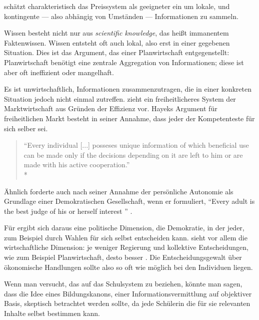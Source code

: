 \citeauthor{hayek-1945} schätzt charakteristisch das Preissystem als geeigneter ein um lokale, und kontingente --- also abhängig von Umständen --- Informationen zu sammeln.

Wissen besteht nicht nur aus \emph{scientific knowledge}, das heißt immanentem Faktenwissen.
Wissen entsteht oft auch lokal, also erst in einer gegebenen Situation.
Dies ist das Argument, das \citeauthor{hayek-1945} einer Planwirtschaft entgegenstellt:
Planwirtschaft benötigt eine zentrale Aggregation von Informationen; diese ist aber oft ineffizient oder mangelhaft.

Es ist unwirtschaftlich, Informationen zusammenzutragen, die in einer konkreten Situation jedoch nicht einmal zutreffen.
\citeauthor{hayek-1945} zieht ein freiheitlicheres System der Marktwirtschaft aus Gründen der Effizienz vor.
Hayeks Argument für freiheitlichen Markt besteht in seiner Annahme, dass jeder der Kompetenteste für sich selber sei.

\begin{quote}
	``Every individual [...] posseses unique information of which beneficial use can be made only if the decisions depending on it are left to him or are made with his active cooperation.''\\*
	\textcite[521]{hayek-1945}
\end{quote}

Ähnlich forderte \citeauthor{Dahl-1989-aa} auch nach seiner Annahme der persönliche Autonomie als Grundlage einer Demokratischen Gesellschaft, wenn er formuliert,
``Every adult is the best judge of his or herself interest '' \parencite[100]{Dahl-1989-aa}.

Für \citeauthor{Dahl-1989-aa} ergibt sich daraus eine politische Dimension, die Demokratie, in der jeder, zum Beispiel durch Wahlen für sich selbst entscheiden kann.
\citeauthor{hayek-1945} sieht vor allem die wirtschaftliche Dimension: je weniger Regierung und kollektive Entscheidungen, wie zum Beispiel Planwirtschaft, desto besser \parencite[527f.]{hayek-1945}.
Die Entscheidungsgewalt über ökonomische Handlungen sollte also so oft wie möglich bei den Individuen liegen.

Wenn man versucht, das auf das Schulsystem zu beziehen, könnte man sagen, dass die Idee eines Bildungskanons, einer Informationsvermittlung auf objektiver Basis, skeptisch betrachtet werden sollte, da jede Schülerin die für sie relevanten Inhalte selbst bestimmen kann.
